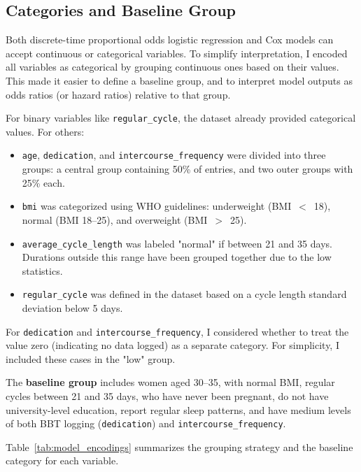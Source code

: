 \documentclass[11pt]{article}
\begin{document}
\subsection{Categories and Baseline Group}

Both discrete-time proportional odds logistic regression and Cox models can accept continuous or categorical variables. To simplify interpretation, I encoded all variables as categorical by grouping continuous ones based on their values. This made it easier to define a baseline group, and to interpret model outputs as odds ratios (or hazard ratios) relative to that group.

For binary variables like \texttt{regular\_cycle}, the dataset already provided categorical values. For others:

\begin{itemize}
  \item \texttt{age}, \texttt{dedication}, and \texttt{intercourse\_frequency} were divided into three groups: a central group containing 50\% of entries, and two outer groups with 25\% each.
  \item \texttt{bmi} was categorized using WHO guidelines: underweight (BMI~$<$~18), normal (BMI 18--25), and overweight (BMI~$>$~25).
  \item \texttt{average\_cycle\_length} was labeled "normal" if between 21 and 35 days. Durations outside this range have been grouped together due to the low statistics.
  \item \texttt{regular\_cycle} was defined in the dataset based on a cycle length standard deviation below 5 days.
\end{itemize}

For \texttt{dedication} and \texttt{intercourse\_frequency}, I considered whether to treat the value zero (indicating no data logged) as a separate category. For simplicity, I included these cases in the "low" group.

The \textbf{baseline group} includes women aged 30--35, with normal BMI, regular cycles between 21 and 35 days, who have never been pregnant, do not have university-level education, report regular sleep patterns, and have medium levels of both BBT logging (\texttt{dedication}) and \texttt{intercourse\_frequency}. 

Table~\ref{tab:model_encodings} summarizes the grouping strategy and the baseline category for each variable.
\end{document}
